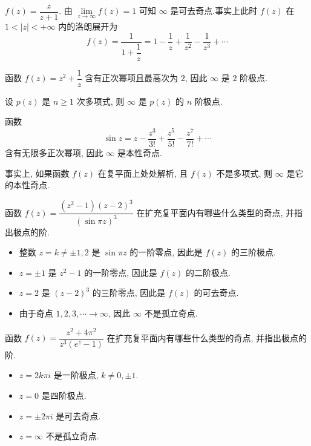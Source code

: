 \begin{example}
		$f(z)=\dfrac z{z+1}$.
	{由 $\lim\limits_{z\to\infty}f(z)=1$ 可知 $\infty$ 是可去奇点.事实上此时 $f(z)$ 在 $1<|z|<+\infty$ 内的洛朗展开为
		\[f(z)=\frac{1}{1+\dfrac1z}=1-\frac1z+\frac1{z^2}-\frac1{z^3}+\cdots\]
	}
\end{example}

\begin{example}
		函数 $f(z)=z^2+\dfrac1z$
	{含有正次幂项且最高次为 $2$, 因此 $\infty$ 是 $2$ 阶极点.
	}
\end{example}

\begin{example}
		设 $p(z)$ 是 $n\ge1$ 次多项式,
	{则 $\infty$ 是 $p(z)$ 的 $n$ 阶极点.
	}
\end{example}

\begin{example}
		函数 
		\[\sin z=z-\frac{z^3}{3!}+\frac{z^5}{5!}-\frac{z^7}{7!}+\cdots\]
	{含有无限多正次幂项, 因此 $\infty$ 是本性奇点.
	}

	{事实上, 如果函数 $f(z)$ 在复平面上处处解析, 且 $f(z)$ 不是多项式, 则 $\infty$ 是它的本性奇点.
	}
\end{example}

\begin{example}
	函数 $f(z)=\dfrac{(z^2-1)(z-2)^3}{(\sin{\pi z})^3}$ 在扩充复平面内有哪些什么类型的奇点, 并指出极点的阶.
\end{example}

\begin{solution}
	\begin{itemize}
		\item 整数 $z=k\neq \pm1,2$ 是 $\sin{\pi z}$ 的一阶零点, 因此是 $f(z)$ 的三阶极点.
		\item $z=\pm1$ 是 $z^2-1$ 的一阶零点, 因此是 $f(z)$ 的二阶极点.
		\item $z=2$ 是 $(z-2)^3$ 的三阶零点, 因此是 $f(z)$ 的可去奇点.
		\item 由于奇点 $1,2,3,\cdots\to \infty$, 因此 $\infty$ 不是孤立奇点.
	\end{itemize}
\end{solution}

\begin{exercise}
	函数 $f(z)=\dfrac{z^2+4\pi^2}{z^3(e^z-1)}$ 在扩充复平面内有哪些什么类型的奇点, 并指出极点的阶.
\end{exercise}

\begin{answer}
	\begin{itemize}
		\item $z=2k\pi i$ 是一阶极点, $k\neq 0,\pm1$.
		\item $z=0$ 是四阶极点.
		\item $z=\pm 2\pi i$ 是可去奇点.
		\item $z=\infty$ 不是孤立奇点.
	\end{itemize}
\end{answer}

